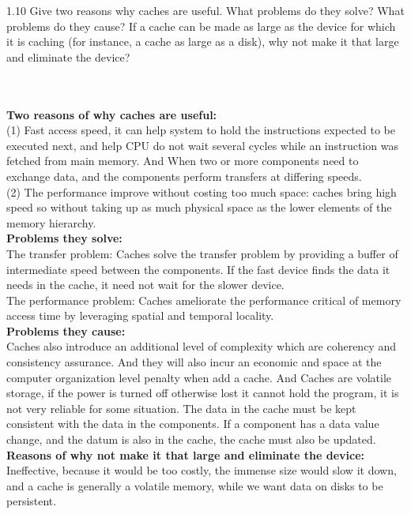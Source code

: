\documentclass[12pt]{article}
\newenvironment{sol}[1][Solution]{\begin{trivlist}\item[\hskip\labelsep {\bfseries #1:}]}{\end{trivlist}}
\begin{document}
\begin{enumerate}
    \item 1.10 Give two reasons why caches are useful. What problems do they solve? What problems do they cause? If a cache can be made as large as the device for which it is caching (for instance, a cache as large as a disk), why not make it that large and eliminate the device?
    \begin{sol}
    \hspace*{\fill} \\
    \\
\textbf{    Two reasons of why caches are useful:}\\
 (1) Fast access speed,  it can help system to hold the instructions expected to be executed next, and help CPU do not wait several cycles while an instruction was fetched from main memory. And When two or more components need to exchange data, and the components perform transfers at differing speeds. \\
(2) The performance improve without costing too much space: caches bring high speed so without taking up as much physical space as the lower elements of the memory hierarchy. \\

\textbf{Problems they solve:\\ }
The transfer problem: Caches solve the transfer problem by providing a buffer of intermediate speed between the components. If the fast device finds the data it needs in the cache, it need not wait for the slower device. \\
The performance problem: Caches ameliorate the performance critical of memory access time by leveraging spatial and temporal locality. \\

\textbf{Problems they cause: }\\
Caches also introduce an additional level of complexity which are coherency and consistency assurance. And they will also incur an economic and space at the computer organization level penalty when add a cache. And Caches are volatile storage, if the power is turned off otherwise lost it cannot hold the program, it is not very reliable for some situation. The data in the cache must be kept consistent with the data in the components. If a component has a data value change, and the datum is also in the cache, the cache must also be updated. \\

\textbf{Reasons of why not make it that large and eliminate the device:  }\\
Ineffective, because it would be too costly, the immense size would slow it down, and a cache is generally a volatile memory, while we want data on disks to be persistent.
    \end{sol}
    \newpage


\end{enumerate}
\end{document}
